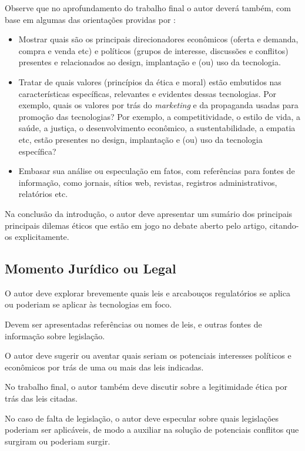 \documentclass[12pt]{article}
\begin{document}
	Observe que no aprofundamento do trabalho final o autor deverá também, com base em algumas das orientações providas por \citet{jones_doing_2016}:
	\begin{itemize}
		\item  Mostrar quais são os principais direcionadores econômicos (oferta e demanda, compra e venda etc) e políticos (grupos de interesse, discussões e conflitos) presentes e relacionados ao design, implantação e (ou) uso da tecnologia.
		
		\item  Tratar de quais valores (princípios da ética e moral) estão embutidos nas características específicas, relevantes e evidentes dessas tecnologias. Por exemplo, quais os valores por trás do \textit{marketing} e da propaganda usadas para promoção das tecnologias? Por exemplo, a competitividade, o estilo de vida, a saúde, a justiça, o desenvolvimento econômico, a sustentabilidade, a empatia etc, estão presentes no design, implantação e (ou) uso da tecnologia específica?
		
		\item  Embasar sua análise ou especulação em fatos, com referências para fontes de informação, como jornais, sítios web, revistas, registros administrativos, relatórios etc. 
	\end{itemize}
	
	Na conclusão da introdução, o autor deve apresentar um sumário dos principais principais dilemas éticos que estão em jogo no debate aberto pelo artigo, citando-os explicitamente.
	
	\subsection{\label{legal}Momento Jurídico ou Legal}
	O autor deve explorar brevemente quais leis e arcabouços regulatórios se aplica ou poderiam se aplicar às tecnologias em foco.
	
	Devem ser apresentadas referências ou nomes de leis, e outras fontes de informação sobre legislação.
	
	O autor deve sugerir ou aventar quais seriam os potenciais interesses políticos e econômicos por trás de uma ou mais das leis indicadas.
	
	No trabalho final, o autor também deve discutir sobre a legitimidade ética por trás das leis citadas.
	
	No caso de falta de legislação, o autor deve especular sobre quais legislações poderiam ser aplicáveis, de modo a auxiliar na solução de potenciais conflitos que surgiram ou poderiam surgir.
	
\end{document}
